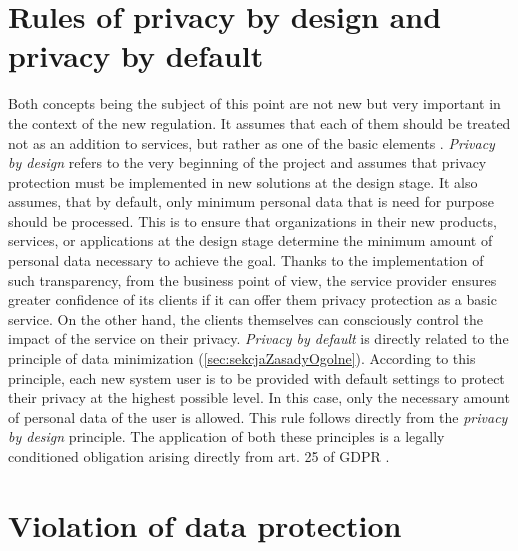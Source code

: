 \documentclass[en, noamssymb]{mgr}
\begin{document}
\section{Rules of privacy by design and privacy by default} \label{sec:prywatnoscDomyslna}
 Both concepts being the subject of this point are not new but very important in the context of the new regulation. It assumes that each of them should be treated not as an addition to services, but rather as one of the basic elements \cite{deloitte_privacyByDesign}. \textit{Privacy by design} refers to the very beginning of the project and assumes that privacy protection must be implemented in new solutions at the design stage. It also assumes, that by default, only minimum personal data that is need for purpose should be processed. This is to ensure that organizations in their new products, services, or applications at the design stage determine the minimum amount of personal data necessary to achieve the goal. Thanks to the implementation of such transparency, from the business point of view, the service provider ensures greater confidence of its clients if it can offer them privacy protection as a basic service. On the other hand, the clients themselves can consciously control the impact of the service on their privacy. \textit{Privacy by default} is directly related to the principle of data minimization (\ref{sec:sekcjaZasadyOgolne}). According to this principle, each new system user is to be provided with default settings to protect their privacy at the highest possible level. In this case, only the necessary amount of personal data of the user is allowed. This rule follows directly from the \textit{privacy by design} principle. The application of both these principles is a legally conditioned obligation arising directly from art. 25 of GDPR \cite{rodo_art25}.

\section{Violation of data protection}
\label{sec:kary}
\end{document}
